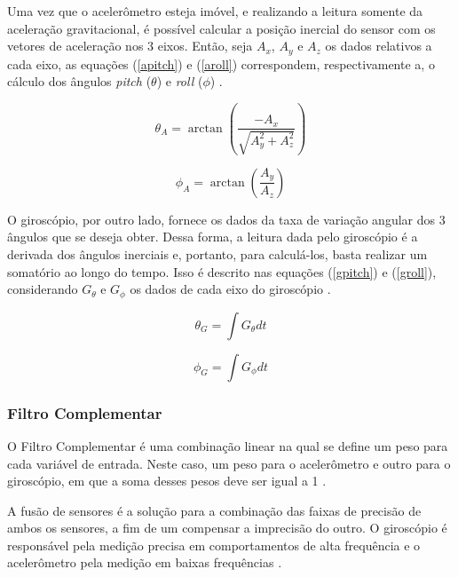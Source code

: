 Uma vez que o acelerômetro esteja imóvel, e realizando a leitura somente da aceleração gravitacional, é possível calcular a posição inercial do sensor com os vetores de aceleração nos 3 eixos. Então, seja $ A_x $, $A_y$ e $A_z$ os dados relativos a cada eixo, as equações (\ref{apitch}) e (\ref{aroll}) correspondem, respectivamente a, o cálculo dos ângulos \textit{pitch} ($ \theta $) e \textit{roll} ($ \phi $) \cite{diss:coimbraSergio}. 

\begin{equation}
	\theta_A = \arctan\left(\dfrac{-A_x}{\sqrt{A_y^2+A_z^2}}\right) 
	\label{apitch}
\end{equation}

\begin{equation}
	\phi_A = \arctan\left(\dfrac{A_y}{A_z}\right)
	\label{aroll}
\end{equation}

O giroscópio, por outro lado, fornece os dados da taxa de variação angular dos 3 ângulos que se deseja obter. Dessa forma, a leitura dada pelo giroscópio é a derivada dos ângulos inerciais e, portanto, para calculá-los, basta realizar um somatório ao longo do tempo. Isso é descrito nas equações (\ref{gpitch}) e (\ref{groll}), considerando $G_{\theta}$ e $G_{\phi}$ os dados de cada eixo do giroscópio  \cite{diss:coimbraSergio}. 

\begin{equation}
	\theta_G = \int G_{\theta} dt
	\label{gpitch}
\end{equation}

\begin{equation}
	\phi_G = \int G_{\phi} dt
	\label{groll}
\end{equation}

\subsubsection{Filtro Complementar}

O Filtro Complementar é uma combinação linear na qual se define um peso para cada variável de entrada. Neste caso, um peso para o acelerômetro e outro para o giroscópio, em que a soma desses pesos deve ser igual a 1 \cite{tcc:viniciusPID2Graus}. 

A fusão de sensores é a solução para a combinação das faixas de precisão de ambos os sensores, a fim de um compensar a imprecisão do outro. O giroscópio é responsável pela medição precisa em comportamentos de alta frequência e o acelerômetro pela medição em baixas frequências \cite{artigo:forscienceKalman}. 

